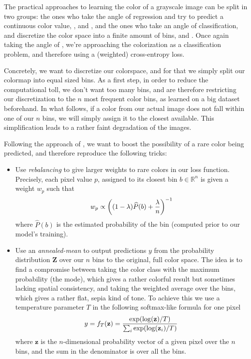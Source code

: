 \documentclass[10pt,twocolumn,letterpaper]{article}
\begin{document}

The practical approaches to learning the color of a grayscale image can be split in two groups: the ones who take the angle of regression and try to predict a continuous color value, \eg \cite{cheng2015deep}, \cite{dahl2016tinyclouds} and \cite{deshpande2015learning}, and the ones who take an angle of classification, and discretize the color space into a finite amount of bins, \eg \cite{charpiat2008automatic} and \cite{zhang2016colorful}. Once again taking the angle of \cite{zhang2016colorful}, we're approaching the colorization as a classification problem, and therefore using a (weighted) cross-entropy loss.

Concretely, we want to discretize our colorspace, and for that we simply split our colormap into equal sized bins. As a first step, in order to reduce the computational toll, we don't want too many bins, and are therefore restricting our discretization to the $n$ most frequent color bins, as learned on a big dataset beforehand. In what follows, if a color from our actual image does not fall within one of our $n$ bins, we will simply assign it to the closest available. This simplification leads to a rather faint degradation of the images.

Following the approach of \cite{zhang2016colorful}, we want to boost the possibility of a rare color being predicted, and therefore reproduce the following tricks:
\begin{itemize}
\item Use \textit{rebalancing} to give larger weights to rare colors in our loss function. Precisely, each pixel value $p$, assigned to its closest bin $b \in \mathbb{R}^n$ is given a weight $w_p$ such that $$w_p \propto \left( (1-\lambda) \widehat{P}(b) + {\lambda \over n} \right)^{-1}$$ where $\widehat{P}(b)$ is the estimated probability of the bin (computed prior to our model's training).
\item Use an \textit{annealed-mean} to output predictions $y$ from the probability distribution $\textbf{Z}$ over our $n$ bins to the original, full color space. The idea is to find a compromise between taking the color class with the maximum probability (the mode), which gives a rather colorful result but sometimes lacking spatial consistency, and taking the weighted average over the bins, which gives a rather flat, sepia kind of tone. To achieve this we use a temperature parameter $T$ in the following softmax-like formula for one pixel $$y = f_T(\textbf{z}) = {\exp(\log(\textbf{z}) / T) \over \sum_i \exp(\log(\textbf{z}_i) / T)}$$ where $\textbf{z}$ is the $n$-dimensional probability vector of a given pixel over the $n$ bins, and the sum in the denominator is over all the bins.
\end{itemize}
\end{document}
